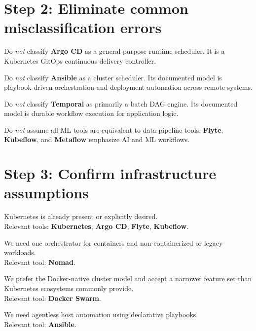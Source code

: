 \documentclass[11pt]{article}
\newcommand{\checkbox}{\makebox[1.6em][l]{\(\square\)}}
\newcommand{\tool}[1]{\textbf{#1}}
\begin{document}
\section{Step 2: Eliminate common misclassification errors}
\checkbox Do \emph{not} classify \tool{Argo CD} as a general-purpose runtime scheduler. It is a Kubernetes GitOps continuous delivery controller.\cite{ArgoCDHome}

\checkbox Do \emph{not} classify \tool{Ansible} as a cluster scheduler. Its documented model is playbook-driven orchestration and deployment automation across remote systems.\cite{AnsiblePlaybooks,AnsibleRolling}

\checkbox Do \emph{not} classify \tool{Temporal} as primarily a batch DAG engine. Its documented model is durable workflow execution for application logic.\cite{TemporalWhatIs,TemporalUnderstanding}

\checkbox Do \emph{not} assume all ML tools are equivalent to data-pipeline tools. \tool{Flyte}, \tool{Kubeflow}, and \tool{Metaflow} emphasize AI and ML workflows.\cite{FlyteOSS,KubeflowIntro,MetaflowWhatIs}

\section{Step 3: Confirm infrastructure assumptions}
\checkbox Kubernetes is already present or explicitly desired.\\
\hspace*{1.2em}Relevant tools: \tool{Kubernetes}, \tool{Argo CD}, \tool{Flyte}, \tool{Kubeflow}.\cite{KubernetesOverview,ArgoCDHome,FlyteOSS,KubeflowIntro}

\checkbox We need one orchestrator for containers and non-containerized or legacy workloads.\\
\hspace*{1.2em}Relevant tool: \tool{Nomad}.\cite{NomadWhatIs}

\checkbox We prefer the Docker-native cluster model and accept a narrower feature set than Kubernetes ecosystems commonly provide.\\
\hspace*{1.2em}Relevant tool: \tool{Docker Swarm}.\cite{DockerSwarm,DockerSwarmConcepts}

\checkbox We need agentless host automation using declarative playbooks.\\
\hspace*{1.2em}Relevant tool: \tool{Ansible}.\cite{AnsiblePlaybooks}
\end{document}

